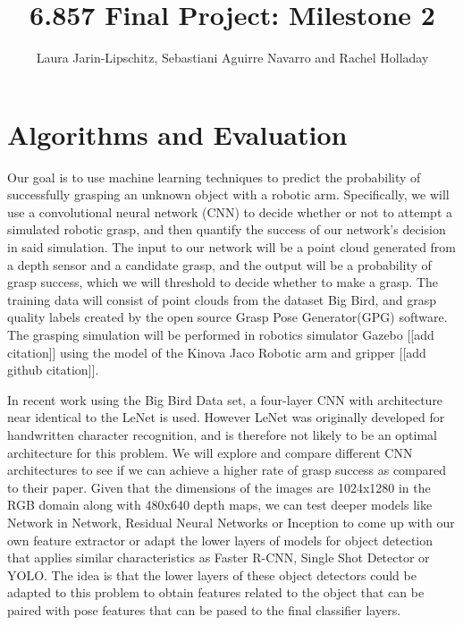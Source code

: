 \documentclass[letterpaper, 10 pt]{article}
\begin{document}
\title{6.857 Final Project: Milestone 2}
\author{Laura Jarin-Lipschitz, Sebastiani Aguirre Navarro and Rachel Holladay}
\maketitle

\section{Algorithms and Evaluation}

Our goal is to use machine learning techniques to predict the probability of successfully grasping an unknown object with a robotic arm. Specifically, we will use a convolutional neural network (CNN) to decide whether or not to attempt a simulated robotic grasp, and then quantify the success of our network's decision in said simulation. The input to our network will be a point cloud generated from a depth sensor and a candidate grasp, and the output will be a probability of grasp success, which we will threshold to decide whether to make a grasp. The training data will consist of point clouds from the dataset Big Bird\cite{singh2014bigbird}, and grasp quality labels created by the open source Grasp Pose Generator(GPG) software\cite{pas2017grasp}. The grasping simulation will be performed in robotics simulator Gazebo [[add citation]] using the model of the Kinova Jaco Robotic arm and gripper [[add github citation]].

In recent work using the Big Bird Data set\cite{pas2017grasp}, a four-layer CNN with architecture near identical to the LeNet\cite{lecun1998gradient} is used. However LeNet was originally developed for handwritten character recognition, and is therefore not likely to be an optimal architecture for this problem. We will explore and compare different CNN architectures to see if we can achieve a higher rate of grasp success as compared to their paper. Given that the dimensions of the images are 1024x1280 in the RGB domain along with 480x640 depth maps, we can test deeper models like Network in Network, Residual Neural Networks or Inception to come up with our own feature extractor or adapt the lower layers of models for object detection that applies similar characteristics as Faster R-CNN, Single Shot Detector or YOLO. The idea is that the lower layers of these object detectors could be adapted to this problem to obtain features related to the object that can be paired with pose features that can be pased to the final classifier layers.
 
\end{document}
